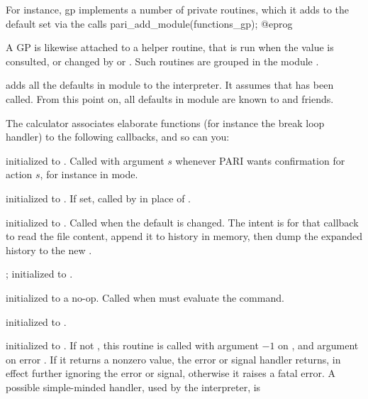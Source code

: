 \noindent For instance, gp implements a number of private routines, which
it adds to the default set via the calls
\bprog
  pari_add_module(functions_gp);
@eprog

A GP  is likewise attached to a helper routine, that is run
when the value is consulted, or changed by  or .
Such routines are grouped in the module .

 adds all the defaults in
module  to the interpreter. It assumes that  has
been called. From this point on, all defaults in module  are known
to  and friends.


The  calculator associates elaborate functions (for instance the
break loop handler) to the following callbacks, and so can you:

initialized to . Called with argument $s$ whenever PARI wants
confirmation for action $s$, for instance in  mode.

initialized to . If set, called by 
in place of .

initialized to . Called when the  default
is changed. The intent is for that callback to read the file content, append
it to history in memory, then dump the expanded history to the new
.

;
initialized to .

initialized to a no-op. Called when  must evaluate the 
command.

initialized to .

initialized to . If not , this routine is called with
argument $-1$ on , and argument  on error . If
it returns a nonzero value, the error or signal handler returns, in effect
further ignoring the error or signal, otherwise it raises a fatal error.
A possible simple-minded handler, used by the  interpreter, is

